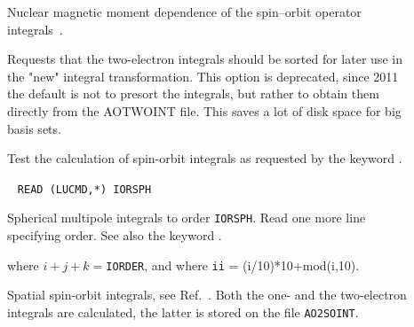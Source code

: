 \begin{description}
\item[] Nuclear magnetic moment dependence of the spin--orbit
operator integrals~\cite{jvkrovjcc20}.


\item[]\label{key:SORT_I} Requests that the
two-electron integrals should be sorted for later use in the "new"
integral transformation. This option is deprecated, since
2011 the default is not to presort the integrals, but rather to
obtain them directly from the AOTWOINT file. This saves a lot of disk
space for big basis sets.

\item[] Test the calculation of spin-orbit integrals as
requested by the keyword .

\item[]\verb| |\newline
\verb|READ (LUCMD,*) IORSPH|

Spherical multipole integrals to order
\verb|IORSPH|. Read one more
line specifying order. See also the keyword .

where $i+j+k =$\verb|IORDER|, and where \verb|ii| = (i/10)*10+mod(i,10).

\item[] Spatial spin-orbit
integrals, see Ref.~\cite{ovhapjhjajthjojcp96}. Both the one- and the
two-electron integrals are calculated, the latter is stored on the file
\verb|AO2SOINT|.



\end{description}
